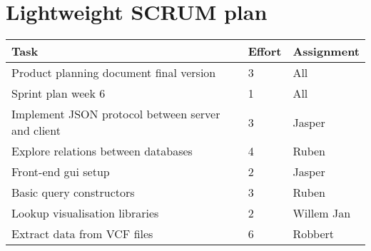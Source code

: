 \documentclass[a4paper]{report}
\begin{document}


\section*{Lightweight SCRUM plan}

\setlength\extrarowheight{5pt}
\begin{table}[ht]
\begin{tabular}{p{8cm}|p{2cm}|p{3cm}}

\textbf{Task} & \textbf{Effort} & \textbf{Assignment}\\
\hline \hline

Product planning document final version & 3 & All\\
Sprint plan week 6 & 1 & All\\
Implement JSON protocol between server and client & 3 & Jasper\\
Explore relations between databases & 4 & Ruben\\
Front-end gui setup & 2 & Jasper\\
Basic query constructors & 3 & Ruben\\
Lookup visualisation libraries & 2 & Willem Jan\\
Extract data from VCF files & 6 & Robbert\\

\end{tabular}
\end{table}
\end{document}
